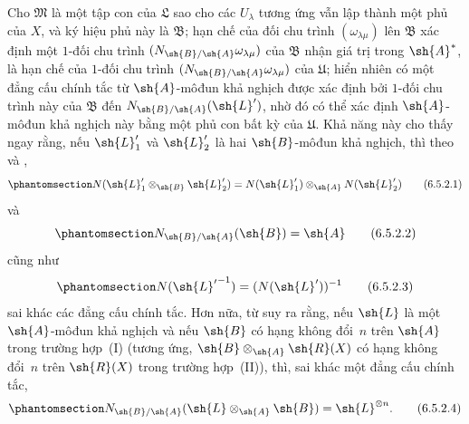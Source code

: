 \documentclass[oneside,10pt]{amsart}
\let\EGAOriginalLabel\label
\renewcommand{\label}[1]{\phantomsection\EGAOriginalLabel{#1}}
\begin{document}
\begin{env}[6.5.2]
Cho $\mathfrak{M}$ là một tập con của $\mathfrak{L}$ sao cho các $U_\lambda$ tương ứng vẫn lập thành một phủ của $X$, và ký hiệu phủ này là $\mathfrak{B}$;
hạn chế của đối chu trình $(\omega_{\lambda\mu})$ lên $\mathfrak{B}$ xác định một $1$-đối chu trình $(N_{\sh{B}/\sh{A}}\omega_{\lambda\mu})$ của $\mathfrak{B}$ nhận giá trị trong $\sh{A}^*$, là hạn chế của $1$-đối chu trình $(N_{\sh{B}/\sh{A}}\omega_{\lambda\mu})$ của $\mathfrak{U}$;
hiển nhiên có một đẳng cấu chính tắc từ $\sh{A}$-môđun khả nghịch được xác định bởi $1$-đối chu trình này của $\mathfrak{B}$ đến $N_{\sh{B}/\sh{A}}(\sh{L}')$, nhờ đó có thể xác định $\sh{A}$-môđun khả nghịch này bằng một phủ con bất kỳ của $\mathfrak{U}$.
Khả năng này cho thấy ngay rằng, nếu $\sh{L}'_1$ và $\sh{L}'_2$ là hai $\sh{B}$-môđun khả nghịch, thì theo  và ,
\[
\label{II.6.5.2.1}
  N(\sh{L}'_1\otimes_{\sh{B}}\sh{L}'_2) = N(\sh{L}'_1)\otimes_{\sh{A}}N(\sh{L}'_2)
\tag{6.5.2.1}
\]
và
\[
\label{II.6.5.2.2}
  N_{\sh{B}/\sh{A}}(\sh{B}) = \sh{A}
\tag{6.5.2.2}
\]
cũng như
\[
\label{II.6.5.2.3}
  N({\sh{L}'}^{-1}) = (N(\sh{L}'))^{-1}
\tag{6.5.2.3}
\]
sai khác các đẳng cấu chính tắc.
Hơn nữa, từ  suy ra rằng, nếu $\sh{L}$ là một $\sh{A}$-môđun khả nghịch và nếu $\sh{B}$ có hạng không đổi~$n$ trên $\sh{A}$ trong trường hợp~(I) (tương ứng, $\sh{B}\otimes_{\sh{A}}\sh{R}(X)$ có hạng không đổi~$n$ trên $\sh{R}(X)$ trong trường hợp~(II)), thì, sai khác một đẳng cấu chính tắc,
\[
\label{II.6.5.2.4}
  N_{\sh{B}/\sh{A}}(\sh{L}\otimes_{\sh{A}}\sh{B}) = \sh{L}^{\otimes n}.
\tag{6.5.2.4}
\]
\end{env}
\end{document}
